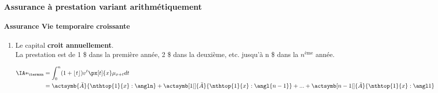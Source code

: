\documentclass[10pt, french]{article}
\begin{document}
\begin{multicols*}{3}
\begin{tikzpicture}[x=0.75pt,y=0.75pt,yscale=-1,xscale=1]
\end{tikzpicture}



\subsubsection*{\textcolor{amber(sae/ece)}{Assurance à prestation variant arithmétiquement}}

\paragraph{Assurance Vie temporaire croissante} 

\begin{enumerate}
	\item[] Le capital \textbf{croit annuellement}.\\
	La prestation est de 1 \$ dans la première année, 2 \$ dans la deuxième, etc. jusqu'à n \$ dans la $n^{\text{ème}}$ année.

\begin{align*}
	\IA*_{\termxn}  &= \int_0^n (1 + \lfloor t \rfloor) v^t \px[t]{x} \mu_{x+t} dt \\
		&= \actsymb{\bar{A}}{\nthtop{1}{x}:\angln} + \actsymb[1|]{\bar{A}}{\nthtop{1}{x}:\angl{n-1}} + ... + \actsymb[n-1|]{\bar{A}}{\nthtop{1}{x}:\angl1}
\end{align*}

\end{enumerate}


\begin{tikzpicture}[x=0.75pt,y=0.75pt,yscale=-1,xscale=1]


\end{tikzpicture}
\end{multicols*}
\end{document}
